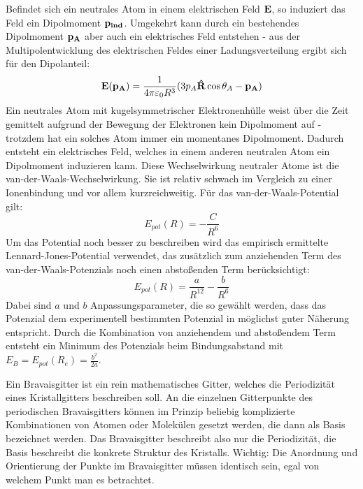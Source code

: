 \label{q:53}

Befindet sich ein neutrales Atom in einem elektrischen Feld $\vb{E}$, so induziert das Feld ein Dipolmoment $\vb{p_{ind}}$. Umgekehrt kann durch ein bestehendes Dipolmoment $\vb{p_A}$ aber auch ein elektrisches Feld entstehen - aus der Multipolentwicklung des elektrischen Feldes einer Ladungsverteilung ergibt sich für den Dipolanteil:
\begin{equation*}
    \vb{E}(\vb{p_A}) = \frac{1}{4\pi\varepsilon_0 R^3} (3 p_A \vb{\hat{R}} \cos{\theta_A} - \vb{p_A})
\end{equation*}
Ein neutrales Atom mit kugelsymmetrischer Elektronenhülle weist über die Zeit gemittelt aufgrund der Bewegung der Elektronen kein Dipolmoment auf - trotzdem hat ein solches Atom immer ein momentanes Dipolmoment. Dadurch entsteht ein elektrisches Feld, welches in einem anderen neutralen Atom ein Dipolmoment induzieren kann. Diese Wechselwirkung neutraler Atome ist die van-der-Waals-Wechselwirkung. Sie ist relativ schwach im Vergleich zu einer Ionenbindung und vor allem kurzreichweitig. Für das van-der-Waals-Potential gilt:
\begin{equation*}
    E_{pot}(R) = -\frac{C}{R^6}
\end{equation*}
Um das Potential noch besser zu beschreiben wird das empirisch ermittelte Lennard-Jones-Potential verwendet, das zusätzlich zum anziehenden Term des van-der-Waals-Potenzials noch einen abstoßenden Term berücksichtigt:
\begin{equation*}
    E_{pot}(R) = \frac{a}{R^{12}} - \frac{b}{R^6}
\end{equation*}
Dabei sind $a$ und $b$ Anpassungsparameter, die so gewählt werden, dass das Potenzial dem experimentell bestimmten Potenzial in möglichst guter Näherung entspricht. Durch die Kombination von anziehendem und abstoßendem Term entsteht ein Minimum des Potenzials beim Bindungsabstand mit $E_B = E_{pot}(R_e) = \frac{b^2}{2a}$.


\label{q:54}

Ein Bravaisgitter ist ein rein mathematisches Gitter, welches die Periodizität eines Kristallgitters beschreiben soll. An die einzelnen Gitterpunkte des periodischen Bravaisgitters können im Prinzip beliebig komplizierte Kombinationen von Atomen oder Molekülen gesetzt werden, die dann als Basis bezeichnet werden. Das Bravaisgitter beschreibt also nur die Periodizität, die Basis beschreibt die konkrete Struktur des Kristalls. Wichtig: Die Anordnung und Orientierung der Punkte im Bravaisgitter müssen identisch sein, egal von welchem Punkt man es betrachtet.

